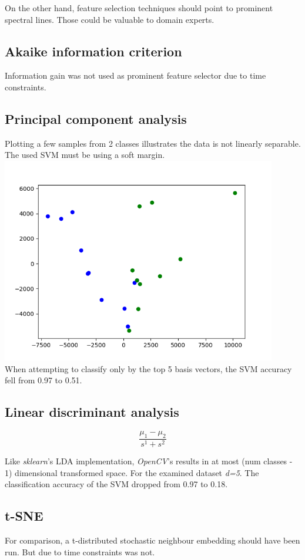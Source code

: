 \documentclass{article}
\begin{document}
On the other hand, feature selection techniques should point to prominent spectral lines.
Those could be valuable to domain experts.


\subsection{Akaike information criterion}
Information gain was not used as prominent feature selector due to time constraints.


\subsection{Principal component analysis}
Plotting a few samples from 2 classes illustrates the data is not linearly separable.
The used SVM must be using a soft margin.
\\
\includegraphics[width=0.9\textwidth]{img/pca}
\\
When attempting to classify only by the top 5 basis vectors, the SVM accuracy fell from 0.97 to 0.51.


\subsection{Linear discriminant analysis}
$$ \frac{ \mu_1 - \mu_2 } { s^1 + s^2 } $$  %

Like \textit{sklearn}'s LDA implementation, \textit{OpenCV}'s results in at most (num classes - 1) dimensional transformed space.
For the examined dataset \textit{d=5}.
The classification accuracy of the SVM dropped from 0.97 to 0.18.


\subsection{t-SNE}
For comparison, a t-distributed stochastic neighbour embedding should have been run.
But due to time constraints was not.
\end{document}
